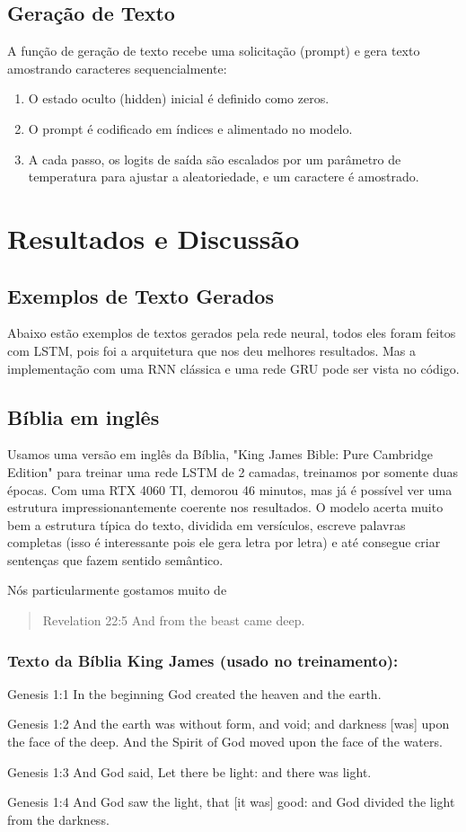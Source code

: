 \documentclass[a4paper,12pt]{article}
\begin{document}
\subsection{Geração de Texto}
A função de geração de texto recebe uma solicitação (prompt) e gera texto amostrando caracteres sequencialmente:
\begin{enumerate}
\item O estado oculto (hidden) inicial é definido como zeros.
\item O prompt é codificado em índices e alimentado no modelo.
\item A cada passo, os logits de saída são escalados por um parâmetro de temperatura para ajustar a aleatoriedade, e um caractere é amostrado.
\end{enumerate}

\section{Resultados e Discussão}
\subsection{Exemplos de Texto Gerados}

Abaixo estão exemplos de textos gerados pela rede neural, todos eles foram feitos com LSTM, pois foi a arquitetura que nos deu melhores resultados. Mas a implementação 
com uma RNN clássica e uma rede GRU pode ser vista no código.

\subsection{Bíblia em inglês}
Usamos uma versão em inglês da Bíblia, "King James Bible: Pure Cambridge Edition" para treinar uma rede LSTM de 2 camadas, treinamos por somente duas épocas. Com 
uma RTX 4060 TI, demorou 46 minutos, mas já é possível ver uma estrutura impressionantemente coerente nos resultados. O modelo acerta muito bem a estrutura 
típica do texto, dividida em versículos, escreve palavras completas (isso é interessante pois ele gera letra por letra) e até consegue criar sentenças que fazem sentido semântico.

Nós particularmente gostamos muito de
\begin{quote}
    Revelation 22:5 And from the beast came deep.
\end{quote}

\subsubsection*{\textbf{Texto da Bíblia King James (usado no treinamento):}}
{
Genesis 1:1	In the beginning God created the heaven and the earth.

Genesis 1:2	And the earth was without form, and void; and darkness [was] upon the face of the deep. And the Spirit of God moved upon the face of the waters.

Genesis 1:3	And God said, Let there be light: and there was light.

Genesis 1:4	And God saw the light, that [it was] good: and God divided the light from the darkness.
}
\end{document}
